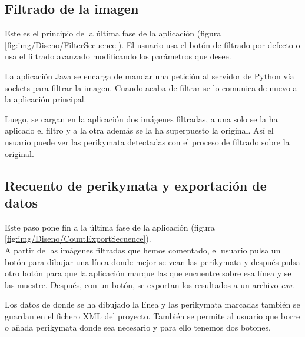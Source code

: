 \pagebreak
\subsection{Filtrado de la imagen}
Este es el principio de la última fase de la aplicación (figura \ref{fig:img/Diseno/FilterSecuence}). El usuario usa el botón de filtrado por defecto o usa el filtrado avanzado modificando los parámetros que desee. 

La aplicación Java se encarga de mandar una petición al servidor de Python vía sockets para filtrar la imagen. Cuando acaba de filtrar se lo comunica de nuevo a la aplicación principal. 

Luego, se cargan en la aplicación dos imágenes filtradas, a una solo se la ha aplicado el filtro y a la otra además se la ha superpuesto la original. Así el usuario puede ver las perikymata detectadas con el proceso de filtrado sobre la original.


\newpage
\subsection{Recuento de perikymata y exportación de datos}
Este paso pone fin a la última fase de la aplicación (figura \ref{fig:img/Diseno/CountExportSecuence}).\\
A partir de las imágenes filtradas que hemos comentado, el usuario pulsa un botón para dibujar una línea donde mejor se vean las perikymata y después pulsa otro botón para que la aplicación marque las que encuentre sobre esa línea y se las muestre. Después, con un botón, se exportan los resultados a un archivo \textit{csv}. 

Los datos de donde se ha dibujado la línea y las perikymata marcadas también se guardan en el fichero XML del proyecto. También se permite al usuario que borre o añada perikymata donde sea necesario y para ello tenemos dos botones.

